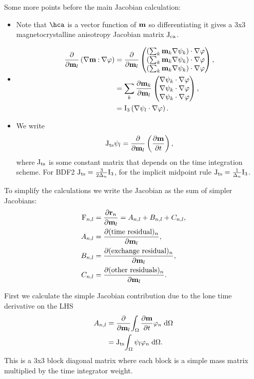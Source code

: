 Some more points before the main Jacobian calculation:
\begin{itemize}
\item Note that $\hca$ is a vector function of $\mathbf{m}$ so differentiating it gives a 3x3 magnetocrystalline anisotropy Jacobian matrix $\mathrm{J}_\text{ca}$.

\item 
  \begin{equation}
    \begin{aligned}
      \frac{\partial }{\partial \mathbf{m}_l} \left(\nabla \mathbf{m} \mathbin{:} \nabla \varphi\right) 
      &= \frac{\partial }{\partial \mathbf{m}_l} \begin{pmatrix} \left( \sum_k \mathbf{m}_k \nabla \psi_k \right) \cdot \nabla \varphi \\ \left( \sum_k \mathbf{m}_k \nabla \psi_k \right) \cdot \nabla \varphi \\ \left( \sum_k \mathbf{m}_k \nabla \psi_k \right) \cdot \nabla \varphi \end{pmatrix}, \\
      &=  \sum_k \frac{\partial \mathbf{m}_k}{\partial \mathbf{m}_l} \begin{pmatrix} \nabla \psi_k \cdot \nabla \varphi \\ \nabla \psi_k \cdot \nabla \varphi \\ \nabla \psi_k \cdot \nabla \varphi \end{pmatrix}, \\
      &=  \mathrm{I}_3 \left(\nabla \psi_l \cdot \nabla \varphi \right).
    \end{aligned}
  \end{equation}


\item We write
  \begin{equation}
    \mathrm{J}_\text{ts} \psi_l = \frac{\partial }{\partial \mathbf{m}_l} \left(\frac{\partial \mathbf{m}}{\partial t} \right),
  \end{equation}
  where $\mathrm{J}_\text{ts}$ is some constant matrix that depends on the time integration scheme.
  For BDF2 $\mathrm{J}_\text{ts} = \frac{3}{2\Delta_{n}} \mathrm{I}_3$, for the implicit midpoint rule $\mathrm{J}_\text{ts} = \frac{1}{\Delta_{n}} \mathrm{I}_3$.
\end{itemize}


To simplify the calculations we write the Jacobian as the sum of simpler Jacobians:
\begin{equation}
  \begin{aligned}
    \mathrm{F}_{n,l} &= \frac{\partial \mathbf{r}_n}{\partial \mathbf{m}_l} = A_{n,l} + B_{n,l} + C_{n,l}, \\
    A_{n,l} &= \frac{\partial (\text{time residual})_n}{\partial \mathbf{m}_l}, \\
    B_{n,l} &= \frac{\partial (\text{exchange residual})_n}{\partial \mathbf{m}_l}, \\
    C_{n,l} &= \frac{\partial (\text{other residuals})_n}{\partial \mathbf{m}_l}.
  \end{aligned}
\end{equation}


First we calculate the simple Jacobian contribution due to the lone time derivative on the LHS
\begin{equation}
  \begin{aligned}
    A_{n,l} &= \frac{\partial }{\partial \mathbf{m}_l} {\int_{\Omega}  \frac{\partial \mathbf{m}}{\partial t} \varphi_n  {\; \text{d}} {\Omega}} \\
           &= \mathrm{J}_\text{ts} {\int_{\Omega}  \psi_l \varphi_n {\; \text{d}}{\Omega}}.
  \end{aligned}
\end{equation}
This is a 3x3 block diagonal matrix where each block is a simple mass matrix multiplied by the time integrator weight.

